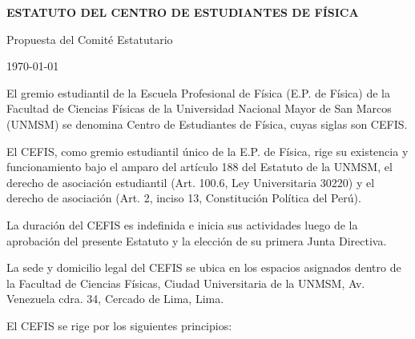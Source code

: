 \documentclass[11pt]{article}
\newcommand{\DocNom}{ESTATUTO DEL CENTRO DE ESTUDIANTES DE FÍSICA}
\newcommand{\DocFecha}{\today}
\newcommand{\DocAutor}{Propuesta del Comité Estatutario}
\begin{document}
\begin{titlepage}
    \null%
    \vfill
    \begin{center}
        {\sffamily\bfseries\LARGE \DocNom\par}
        {\sffamily\Large \DocAutor\par}
        {\sffamily\large \DocFecha\par}
    \end{center}
    \vfill
\end{titlepage}

\tableofcontents
\clearpage
{}



El gremio estudiantil de la Escuela Profesional de Física (E.P. de Física) de la Facultad de Ciencias Físicas de la Universidad Nacional Mayor de San Marcos (UNMSM) se denomina Centro de Estudiantes de Física, cuyas siglas son CEFIS.\@{}

El CEFIS, como gremio estudiantil único de la E.P. de Física, rige su existencia y funcionamiento bajo el amparo del artículo 188 del Estatuto de la UNMSM, el derecho de asociación estudiantil (Art. 100.6, Ley Universitaria 30220) y el derecho de asociación (Art. 2, inciso 13, Constitución Política del Perú).

La duración del CEFIS es indefinida e inicia sus actividades luego de la aprobación del presente Estatuto y la elección de su primera Junta Directiva.

La sede y domicilio legal del CEFIS se ubica en los espacios asignados dentro de la Facultad de Ciencias Físicas, Ciudad Universitaria de la UNMSM, Av. Venezuela cdra. 34, Cercado de Lima, Lima.

El CEFIS se rige por los siguientes principios:
\begin{artitems}[nosep]
\end{artitems}
\end{document}
